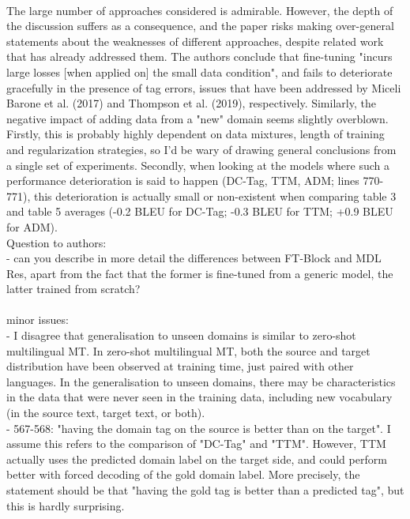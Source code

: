 \documentclass[12pt,times,a4paper,twoside]{article}
\newcommand{\fyTodo}[1]{\Todo[FY:]{\textcolor{orange}{#1}}}
\theoremstyle{definition}
\begin{document}
\\
The large number of approaches considered is admirable. However, the depth of the discussion suffers as a consequence, and the paper risks making over-general statements about the weaknesses of different approaches, despite related work that has already addressed them. The authors conclude that fine-tuning "incurs large losses [when applied on] the small data condition", and fails to deteriorate gracefully in the presence of tag errors, issues that have been addressed by Miceli Barone et al. (2017) and Thompson et al. (2019), respectively. Similarly, the negative impact of adding data from a "new" domain seems slightly overblown. Firstly, this is probably highly dependent on data mixtures, length of training and regularization strategies, so I'd be wary of drawing general conclusions from a single set of experiments. Secondly, when looking at the models where such a performance deterioration is said to happen (DC-Tag, TTM, ADM; lines
770-771), this deterioration is actually small or non-existent when
comparing table 3 and table 5 averages (-0.2 BLEU for DC-Tag; -0.3 BLEU for TTM; +0.9 BLEU for ADM).
\\
Question to authors:
\\
- can you describe in more detail the differences between FT-Block and MDL Res, apart from the fact that the former is fine-tuned from a generic model, the latter trained from scratch?
\\
\fyTodo{system's description}
\\
minor issues:
\\
- I disagree that generalisation to unseen domains is similar to zero-shot multilingual MT. In zero-shot multilingual MT, both the source and target distribution have been observed at training time, just paired with other languages. In the generalisation to unseen domains, there may be characteristics in the data that were never seen in the training data, including new vocabulary (in the source text, target text, or both).
\\
- 567-568: "having the domain tag on the source is better than on the
target". I assume this refers to the comparison of "DC-Tag" and "TTM". However, TTM actually uses the predicted domain label on the target side, and could perform better with forced decoding of the gold domain label. More precisely, the statement should be that "having the gold tag is better than a predicted tag", but this is hardly surprising.
\end{document}
